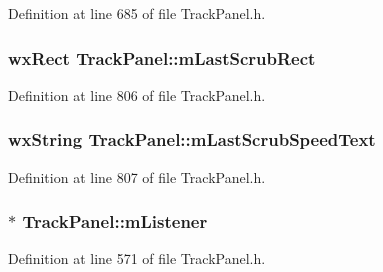 Definition at line 685 of file Track\+Panel.\+h.

\subsubsection[{\texorpdfstring{m\+Last\+Scrub\+Rect}{mLastScrubRect}}]{\setlength{\rightskip}{0pt plus 5cm}wx\+Rect Track\+Panel\+::m\+Last\+Scrub\+Rect\hspace{0.3cm}{\ttfamily [protected]}}\hypertarget{class_track_panel_a2cd5595843ff183a9d1bdcd7e911ccb4}{}\label{class_track_panel_a2cd5595843ff183a9d1bdcd7e911ccb4}


Definition at line 806 of file Track\+Panel.\+h.

\subsubsection[{\texorpdfstring{m\+Last\+Scrub\+Speed\+Text}{mLastScrubSpeedText}}]{\setlength{\rightskip}{0pt plus 5cm}wx\+String Track\+Panel\+::m\+Last\+Scrub\+Speed\+Text\hspace{0.3cm}{\ttfamily [protected]}}\hypertarget{class_track_panel_aef295ebe27bee4656a73854346945495}{}\label{class_track_panel_aef295ebe27bee4656a73854346945495}


Definition at line 807 of file Track\+Panel.\+h.

\subsubsection[{\texorpdfstring{m\+Listener}{mListener}}]{$\ast$ Track\+Panel\+::m\+Listener\hspace{0.3cm}{\ttfamily [protected]}}\hypertarget{class_track_panel_a0f11708f158f21a3600c407b483aa0d5}{}\label{class_track_panel_a0f11708f158f21a3600c407b483aa0d5}


Definition at line 571 of file Track\+Panel.\+h.

